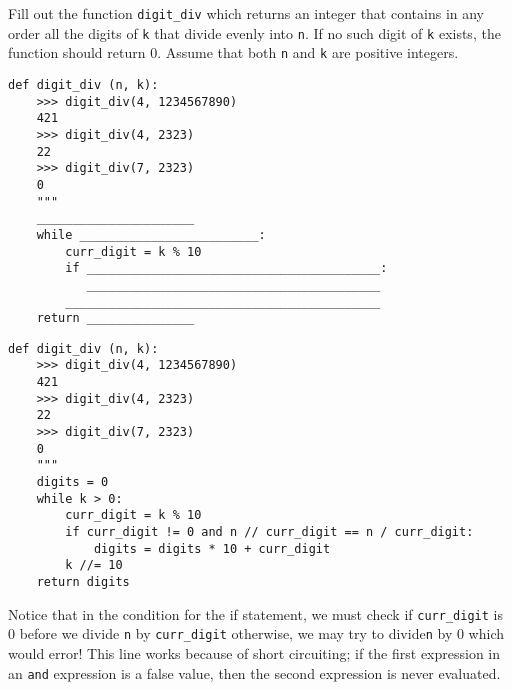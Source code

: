 \question Fill out the function \lstinline{digit_div} which returns an integer that contains in any order all the digits of \lstinline{k} that divide evenly into \lstinline{n}. If no such digit of \lstinline{k} exists, the function should return 0. Assume that both \lstinline{n} and \lstinline{k} are positive integers.

\begin{blocksection}
\begin{lstlisting}
def digit_div (n, k):
    >>> digit_div(4, 1234567890)
    421
    >>> digit_div(4, 2323)
    22
    >>> digit_div(7, 2323)
    0
    """
    ______________________
    while _________________________:
        curr_digit = k % 10
        if _________________________________________:
           _________________________________________
        ____________________________________________
    return _______________
\end{lstlisting}
\end{blocksection}

\begin{blocksection}
\begin{solution}
\begin{lstlisting}
def digit_div (n, k):
    >>> digit_div(4, 1234567890)
    421
    >>> digit_div(4, 2323)
    22
    >>> digit_div(7, 2323)
    0
    """
    digits = 0
    while k > 0:
        curr_digit = k % 10
        if curr_digit != 0 and n // curr_digit == n / curr_digit:
            digits = digits * 10 + curr_digit
        k //= 10
    return digits
\end{lstlisting}
Notice that in the condition for the if statement, we must check if \lstinline{curr_digit} is 0 before we divide \lstinline{n} by \lstinline{curr_digit} otherwise, we may try to divide\lstinline{n} by 0 which would error! This line works because of short circuiting; if the first expression in an \lstinline{and} expression is a false value, then the second expression is never evaluated.
\end{solution}
\end{blocksection}